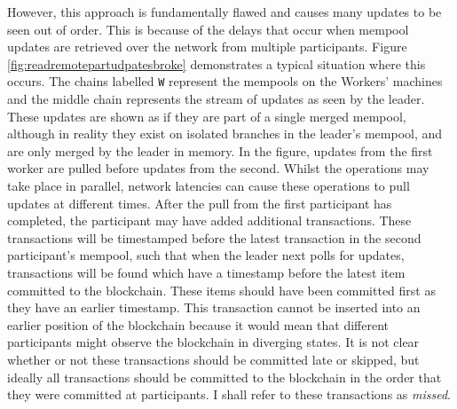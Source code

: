 \documentclass[12pt,a4paper,twoside,openright]{report}
\begin{document}
	However, this approach is fundamentally flawed and causes many updates to be seen out of order. 
	This is because of the delays that occur when mempool updates are retrieved over the network from multiple participants.
	Figure \ref{fig:readremotepartudpatesbroke} demonstrates a typical situation where this occurs.
	The chains labelled \texttt{W} represent the mempools on the Workers' machines and the middle chain represents the stream of updates as seen by the leader. These updates are shown as if they are part of a single merged mempool, although in reality they exist on isolated branches in the leader's mempool, and are only merged by the leader in memory.
	In the figure, updates from the first worker are pulled before updates from the second.
	Whilst the operations may take place in parallel, network latencies can cause these operations to pull updates at different times.
	After the pull from the first participant has completed, the participant may have added additional transactions. 
	These transactions will be timestamped before the latest transaction in the second participant's mempool, such that when the leader next polls for updates, transactions will be found which have a timestamp before the latest item committed to the blockchain.
	These items should have been committed first as they have an earlier timestamp.
	This transaction cannot be inserted into an earlier position of the blockchain because it would mean that different participants might observe the blockchain in diverging states.
	It is not clear whether or not these transactions should be committed late or skipped, but ideally all transactions should be committed to the blockchain in the order that they were committed at participants.
	I shall refer to these transactions as \textit{missed}.
\end{document}
